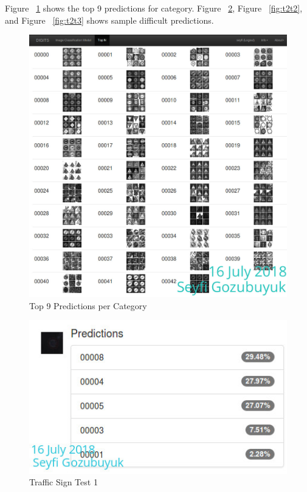 \documentclass[10pt,journal,compsoc]{IEEEtran}
\begin{document}
Figure ~\ref{fig:t2tnpc} shows the top 9 predictions for category. Figure ~\ref{fig:t2t1}, Figure ~\ref{fig:t2t2}, and Figure ~\ref{fig:t2t3} shows sample difficult predictions.

\begin{figure}[thpb]
      \centering
      \includegraphics[width=\linewidth]{figures/TopNperCat.png}
      \caption{Top 9 Predictions per Category}
      \label{fig:t2tnpc}
\end{figure}


\begin{figure}[thpb]
      \centering
      \includegraphics[width=\linewidth]{figures/t2t1.png}
      \caption{Traffic Sign Test 1}
      \label{fig:t2t1}
\end{figure}
\end{document}
